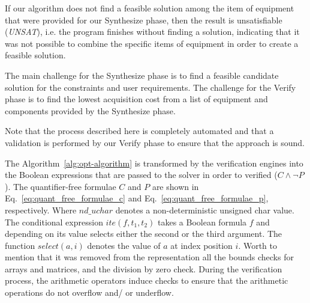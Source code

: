 If our algorithm does not find a feasible solution among the item of equipment that were provided for our {\sc Synthesize} phase,  then the result is unsatisfiable (\textit{UNSAT}), i.e. the program finishes without finding a solution, indicating that it was not possible to combine the specific items of equipment in order to create a feasible solution. 

The main challenge for the {\sc Synthesize} phase is to find a feasible candidate solution for the constraints and user requirements. The challenge for the {\sc Verify} phase is to find the lowest acquisition cost from a list of equipment and components provided by the {\sc Synthesize} phase. 

Note that the process described here is completely automated and that a validation is performed by our {\sc Verify} phase to ensure that the approach is sound.

The Algorithm~\ref{alg:opt-algorithm} is transformed by the verification engines into the Boolean expressions that are passed to the solver in order to verified ($C \wedge \neg P$). The quantifier-free formulae $C$ and $P$ are shown in Eq.~\ref{eq:quant_free_formulae_c} and Eq.~\ref{eq:quant_free_formulae_p}, respectively. Where $nd\_uchar$ denotes a non-deterministic unsigned char value. The conditional expression $ite(f,t_1,t_2)$ takes a Boolean formula $f$ and depending on its value selects either the second or the third argument. The function $select(a,i)$ denotes the value of $a$ at index position $i$. Worth to mention that it was removed from the representation all the bounds checks for arrays and matrices, and the division by zero check. During the verification process, the arithmetic operators induce checks to ensure that the arithmetic operations do not overflow and/ or underflow.

